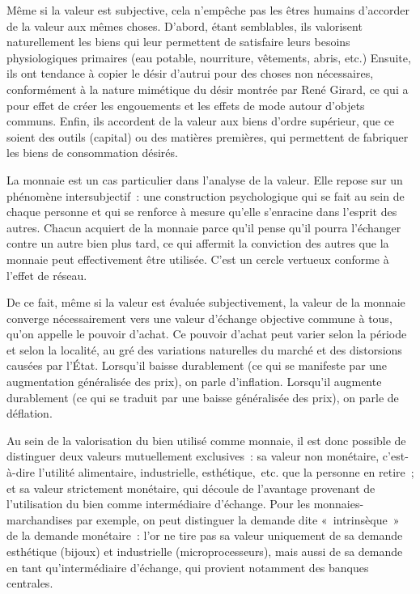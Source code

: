 Même si la valeur est subjective, cela n'empêche pas les êtres humains d'accorder de la valeur aux mêmes choses. D'abord, étant semblables, ils valorisent naturellement les biens qui leur permettent de satisfaire leurs besoins physiologiques primaires (eau potable, nourriture, vêtements, abris, etc.) Ensuite, ils ont tendance à copier le désir d'autrui pour des choses non nécessaires, conformément à la nature mimétique du désir montrée par René Girard, ce qui a pour effet de créer les engouements et les effets de mode autour d'objets communs. Enfin, ils accordent de la valeur aux biens d'ordre supérieur, que ce soient des outils (capital) ou des matières premières, qui permettent de fabriquer les biens de consommation désirés.


La monnaie est un cas particulier dans l'analyse de la valeur. Elle repose sur un phénomène intersubjectif~: une construction psychologique qui se fait au sein de chaque personne et qui se renforce à mesure qu'elle s'enracine dans l'esprit des autres. Chacun acquiert de la monnaie parce qu'il pense qu'il pourra l'échanger contre un autre bien plus tard, ce qui affermit la conviction des autres que la monnaie peut effectivement être utilisée. C'est un cercle vertueux conforme à l'effet de réseau.

De ce fait, même si la valeur est évaluée subjectivement, la valeur de la monnaie converge nécessairement vers une valeur d'échange objective commune à tous, qu'on appelle le pouvoir d'achat. Ce pouvoir d'achat peut varier selon la période et selon la localité, au gré des variations naturelles du marché et des distorsions causées par l'État. Lorsqu'il baisse durablement (ce qui se manifeste par une augmentation généralisée des prix), on parle d'inflation. Lorsqu'il augmente durablement (ce qui se traduit par une baisse généralisée des prix), on parle de déflation.

Au sein de la valorisation du bien utilisé comme monnaie, il est donc possible de distinguer deux valeurs mutuellement exclusives~: sa valeur non monétaire, c'est-à-dire l'utilité alimentaire, industrielle, esthétique,~etc. que la personne en retire~; et sa valeur strictement monétaire, qui découle de l'avantage provenant de l'utilisation du bien comme intermédiaire d'échange. Pour les monnaies-marchandises par exemple, on peut distinguer la demande dite «~intrinsèque~» de la demande monétaire~: l'or ne tire pas sa valeur uniquement de sa demande esthétique (bijoux) et industrielle (microprocesseurs), mais aussi de sa demande en tant qu'intermédiaire d'échange, qui provient notamment des banques centrales.

